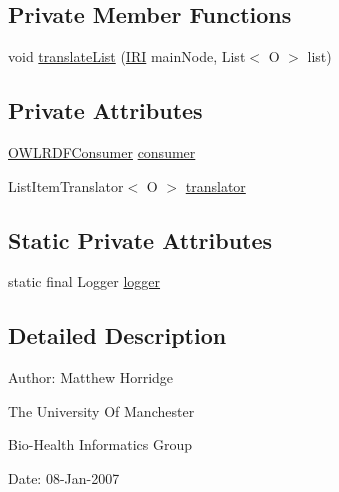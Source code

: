 \subsection*{Private Member Functions}
\begin{DoxyCompactItemize}
\item 
void \hyperlink{classorg_1_1coode_1_1owlapi_1_1rdfxml_1_1parser_1_1_optimised_list_translator_3_01_o_01extends_01_o_w_l_object_01_4_a30d0af99525e9c2075f7b59c7227ba87}{translate\-List} (\hyperlink{classorg_1_1semanticweb_1_1owlapi_1_1model_1_1_i_r_i}{I\-R\-I} main\-Node, List$<$ O $>$ list)
\end{DoxyCompactItemize}
\subsection*{Private Attributes}
\begin{DoxyCompactItemize}
\item 
\hyperlink{classorg_1_1coode_1_1owlapi_1_1rdfxml_1_1parser_1_1_o_w_l_r_d_f_consumer}{O\-W\-L\-R\-D\-F\-Consumer} \hyperlink{classorg_1_1coode_1_1owlapi_1_1rdfxml_1_1parser_1_1_optimised_list_translator_3_01_o_01extends_01_o_w_l_object_01_4_a013817e4f5126b4c65babe9d40ff4a42}{consumer}
\item 
List\-Item\-Translator$<$ O $>$ \hyperlink{classorg_1_1coode_1_1owlapi_1_1rdfxml_1_1parser_1_1_optimised_list_translator_3_01_o_01extends_01_o_w_l_object_01_4_a521d828eda75fbc3a5bf878b0bb98286}{translator}
\end{DoxyCompactItemize}
\subsection*{Static Private Attributes}
\begin{DoxyCompactItemize}
\item 
static final Logger \hyperlink{classorg_1_1coode_1_1owlapi_1_1rdfxml_1_1parser_1_1_optimised_list_translator_3_01_o_01extends_01_o_w_l_object_01_4_a563d49cc0505b8a8e88213a21210550a}{logger}
\end{DoxyCompactItemize}


\subsection{Detailed Description}
Author\-: Matthew Horridge\par
 The University Of Manchester\par
 Bio-\/\-Health Informatics Group\par
 Date\-: 08-\/\-Jan-\/2007\par
 \par
 

